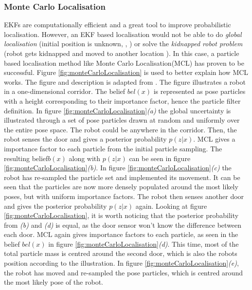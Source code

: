 \subsubsection{Monte Carlo Localisation}
EKFs are computationally efficient and a great tool to improve probabilistic localisation. However, an EKF based localisation would not be able to do \textit{global localisation} (initial position is unknown, \cite{SiegwartRoland2011Itam}, \cite{ThrunSebastian2005Pr}) or solve the \textit{kidnapped robot problem} (robot gets kidnapped and moved to another location \cite{SiegwartRoland2011Itam} \cite{ThrunSebastian2005Pr}). In this case, a particle based localisation method like Monte Carlo Localisation(MCL) has proven to be successful. Figure \ref{fig:monteCarloLocalisation} is used to better explain how MCL works. The figure and description is adapted from \cite{ThrunSebastian2005Pr}. The figure illustrates a robot in a one-dimensional corridor. The belief $bel(x)$ is represented as pose particles with a height corresponding to their importance factor, hence the particle filter definition. In figure \ref{fig:monteCarloLocalisation}\textit{(a)} the global uncertainty is illustrated through a set of pose particles drawn at random and uniformly over the entire pose space. The robot could be anywhere in the corridor. Then, the robot senses the door and gives a posterior probability $p(z|x)$. MCL gives a importance factor to each particle from the initial particle sampling. The resulting belief$b(x)$ along with $p(z|x)$ can be seen in figure \ref{fig:monteCarloLocalisation}\textit{(b)}. In figure \ref{fig:monteCarloLocalisation}\textit{(c)} the robot has re-sampled the particle set and implemented its movement. It can be seen that the particles are now more densely populated around the most likely poses, but with uniform importance factors. The robot then senses another door and gives the posterior probability $p(z|x)$ again. Looking at figure \ref{fig:monteCarloLocalisation}, it is worth noticing that the posterior probability from \textit{(b)} and \textit{(d)} is equal, as the door sensor won't know the difference between each door. MCL again gives importance factors to each particle, as seen in the belief $bel(x)$ in figure \ref{fig:monteCarloLocalisation}\textit{(d)}. This time, most of the total particle mass is centred around the second door, which is also the robots position according to the illustration. In figure \ref{fig:monteCarloLocalisation}\textit{(e)}, the robot has moved and re-sampled the pose particles, which is centred around the most likely pose of the robot.

